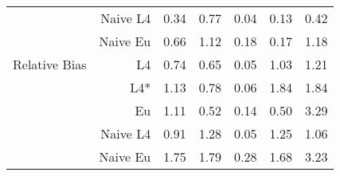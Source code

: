 \documentclass[a4paper,12pt,twoside]{book}
\begin{document}
\begin{table}[H]
\begin{tabular}{crrrrrr}
&Naive L4&  
  0.34 & 0.77 & 0.04 & 0.13 & 0.42 \\ 
   
&Naive Eu &  0.66 & 1.12 & 0.18 & 0.17 & 1.18 \\ 
  
  
   \hline
   
{\color{blue} Relative Bias } & L4  &0.74 & 0.65 & 0.05 & 1.03 & 1.21 \\ 
 
&L4*  &  1.13 & 0.78 & 0.06 & 1.84 & 1.84 \\ 
 
  
&Eu &  
   1.11 & 0.52 & 0.14 & 0.50 & 3.29 \\ 
  
&Naive L4&  
 0.91 & 1.28 & 0.05 & 1.25 & 1.06 \\ 
 
  
  
&Naive Eu &  
 1.75 & 1.79 & 0.28 & 1.68 & 3.23 \\ 
  
  
\end{tabular}

\end{table}
\end{document}
